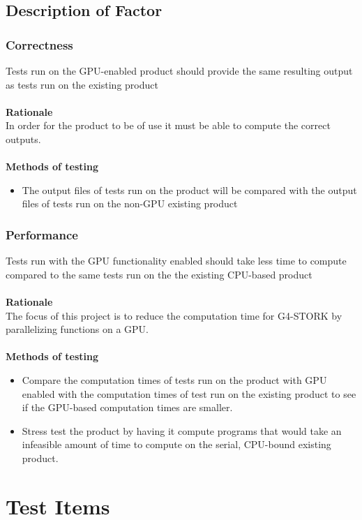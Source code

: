 \documentclass[12pt]{article}
\begin{document}
\subsection{Description of Factor} %
\subsubsection{Correctness}
Tests run on the GPU-enabled product should provide the same resulting output as tests run on the existing product\\\\
\textbf{Rationale}\\
In order for the product to be of use it must be able to compute the correct outputs.\\\\
\textbf{Methods of testing}
\begin{itemize}
\item The output files of tests run on the product will be compared with the output files of tests run on the non-GPU existing product
\end{itemize}

\subsubsection{Performance}
Tests run with the GPU functionality enabled should take less time to compute compared to the same tests run on the the existing CPU-based product\\\\
\textbf{Rationale}\\
The focus of this project is to reduce the computation time for G4-STORK by parallelizing functions on a GPU. \\\\
\textbf{Methods of testing}
\begin{itemize}
\item Compare the computation times of tests run on the product with GPU enabled with the computation times of test run on the existing product to see if the GPU-based computation times are smaller.
\item Stress test the product by having it compute programs that would take an infeasible amount of time to compute on the serial, CPU-bound existing product.
\end{itemize}

\section{Test Items}
\end{document}
